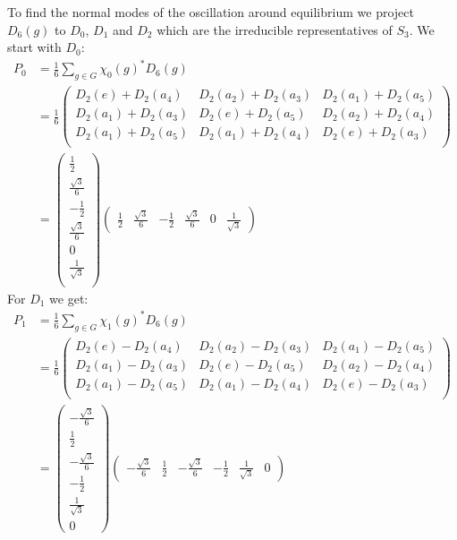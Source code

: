 \documentclass[a4paper]{article}
\theoremstyle{definition}
\theoremstyle{definition}
\theoremstyle{definition}
\theoremstyle{theorem}
\theoremstyle{theorem}
\theoremstyle{definition}
\begin{document}
To find the  normal modes of the oscillation around equilibrium we project $D_6(g)$ to $D_0$, $D_1$ and $D_2$
which are the irreducible representatives of $S_3$.
\newline
We start with $D_0$:
\begin{align}
    P_0 &= \frac{1}{6} \sum _{g\in G} \chi _{0}(g)^* D_6(g) \nonumber \\
        &=\frac{1}{6}
        \begin{pmatrix}
            D_2(e)+D_2(a_4) & D_2(a_2)+D_2(a_3) & D_2(a_1)+D_2(a_5) \\
            D_2(a_1)+D_2(a_3) & D_2(e)+D_2(a_5) & D_2(a_2)+D_2(a_4)\\
            D_2(a_1)+D_2(a_5) & D_2(a_1)+D_2(a_4) & D_2(e)+D_2(a_3) \\
        \end{pmatrix} \nonumber\\
        &=
        \begin{pmatrix}
            \frac{1}{2} \\
            \frac{\sqrt{3}}{6} \\
            -\frac{1}{2} \\
            \frac{\sqrt{3}}{6} \\
            0 \\
            \frac{1}{\sqrt{3}} \\
        \end{pmatrix}
        \begin{pmatrix}
            \frac{1}{2} & \frac{\sqrt{3}}{6} & -\frac{1}{2} &\frac{\sqrt{3}}{6} &  0  & \frac{1}{\sqrt{3}}
        \end{pmatrix}
        \label{eig: 1}
\end{align}
For $D_1$ we get:
\begin{align}
    P_1 &= \frac{1}{6} \sum _{g\in G} \chi _{1}(g)^* D_6(g) \nonumber \\
        &=\frac{1}{6}
        \begin{pmatrix}
            D_2(e)-D_2(a_4) & D_2(a_2)-D_2(a_3) & D_2(a_1)-D_2(a_5) \\
            D_2(a_1)-D_2(a_3) & D_2(e)-D_2(a_5) & D_2(a_2)-D_2(a_4)\\
            D_2(a_1)-D_2(a_5) & D_2(a_1)-D_2(a_4) & D_2(e)-D_2(a_3) \\
        \end{pmatrix} \nonumber\\
        &=
        \begin{pmatrix}
            -\frac{\sqrt{3}}{6} \\
            \frac{1}{2} \\
            -\frac{\sqrt{3}}{6} \\
            -\frac{1}{2} \\
            \frac{1}{\sqrt{3}} \\
            0
        \end{pmatrix}
        \begin{pmatrix}
            -\frac{\sqrt{3}}{6} & \frac{1}{2} & -\frac{\sqrt{3}}{6} &-\frac{1}{2} &  \frac{1}{\sqrt{3}} & 0
        \end{pmatrix}
        \label{eig: 2}
\end{align}
\end{document}
